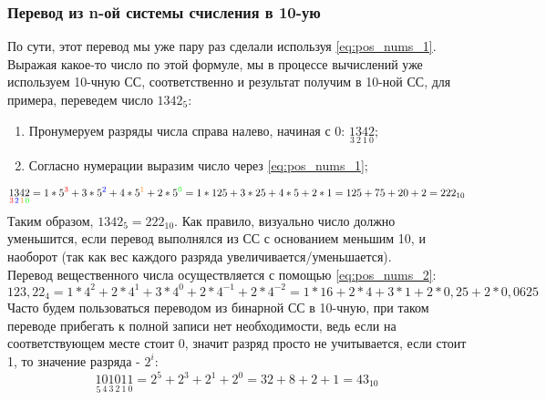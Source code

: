 \documentclass[12pt]{article}
\theoremstyle{problem_style}
\begin{document}
\subsubsection{Перевод из n-ой системы счисления в 10-ую}\label{sec:base_n_to_base_10}
По сути, этот перевод мы уже пару раз сделали используя \autoref{eq:pos_nums_1}. Выражая какое-то число по этой формуле, мы в процессе вычислений уже используем 10-чную СС, соответственно и результат получим в 10-ной СС, для примера, переведем число $1342_5$:
\begin{enumerate}
    \item Пронумеруем разряды числа справа налево, начиная с 0: $\underset{3}{1} \underset{2}{3} \underset{1}{4} \underset{0}{2}$;
    \item Согласно нумерации выразим число через \autoref{eq:pos_nums_1};
\end{enumerate}
\[
\underset{\textcolor{red}{3}}{1} \underset{\textcolor{blue}{2}}{3} \underset{\textcolor{orange}{1}}{4} \underset{\textcolor{green}{0}}{2} = 1 * 5^{\textcolor{red}{3}} + 3 * 5^{\textcolor{blue}{2}} + 4 * 5^{\textcolor{orange}{1}} + 2 * 5^{\textcolor{green}{0}} = 1 * 125 + 3 * 25 + 4 * 5 + 2 * 1 = 125 + 75 + 20 + 2 = 222_{10} 
\]
Таким образом, $1342_5 = 222_{10}$. Как правило, визуально число должно уменьшится, если перевод выполнялся из СС с основанием меньшим 10, и наоборот (так как вес каждого разряда увеличивается/уменьшается).\\
Перевод вещественного числа осуществляется с помощью \autoref{eq:pos_nums_2}:
\[
123,22_{4} = 1 * 4^2 + 2 * 4^1 + 3 * 4^0 + 2 * 4^{-1} + 2 * 4^{-2} = 1 * 16 + 2 * 4 + 3 * 1 + 2 * 0,25 + 2 * 0,0625 
\]
Часто будем пользоваться переводом из бинарной СС в 10-чную, при таком переводе прибегать к полной записи нет необходимости, ведь если на соответствующем месте стоит 0, значит разряд просто не учитывается, если стоит 1, то значение разряда - $2^i$:
\[
\underset{5}{1} \underset{4}{0} \underset{3}{1} \underset{2}{0} \underset{1}{1} \underset{0}{1} = 2^5 + 2^3 + 2^1 + 2^0 = 32 + 8 + 2 + 1 = 43_{10}
\]
\end{document}
